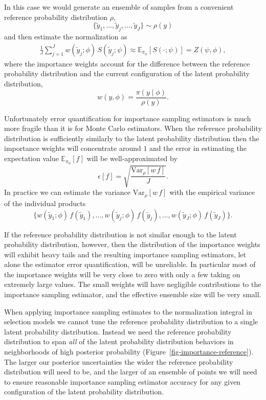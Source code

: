 \documentclass[
  letterpaper,
  DIV=11,
  numbers=noendperiod]{scrartcl}
\begin{document}
In this case we would generate an ensemble of samples from a convenient
reference probability distribution \(\rho\), \[
\{ \tilde{y}_{1}, \ldots, \tilde{y}_{j}, \ldots, \tilde{y}_{J} \}
\sim \rho(y)
\] and then estimate the normalization as \begin{align*}
\frac{1}{J} \sum_{j = 1}^{J}
w(\tilde{y}_{j}; \phi) \, S(\tilde{y}_{j}; \psi)
\approx
\mathbb{E}_{\pi_{\phi}}[ S(\cdot ; \psi) ]
=
Z(\psi, \phi),
\end{align*} where the importance weights account for the difference
between the reference probability distribution and the current
configuration of the latent probability distribution, \[
w \! \left( y, \phi \right)
=
\frac{ \pi(y \mid \phi) }{ \rho(y) }.
\]

Unfortunately error quantification for importance sampling estimators is
much more fragile than it is for Monte Carlo estimators. When the
reference probability distribution is sufficiently similarly to the
latent probability distribution then the importance weights will
concentrate around \(1\) and the error in estimating the expectation
value \(\mathbb{E}_{\pi_{\phi}}[f]\) will be well-approximated by \[
\epsilon[f] =
\sqrt{ \frac{\mathrm{Var}_{\rho}[w \, f] }{J} }.
\] In practice we can estimate the variance
\(\mathrm{Var}_{\rho}[w \, f]\) with the empirical variance of the
individual products \[
\{ w(\tilde{y}_{1}; \phi) \, f(\tilde{y}_{1}), \ldots,
   w(\tilde{y}_{j}; \phi) \, f(\tilde{y}_{j}), \ldots,
   w(\tilde{y}_{J}; \phi) \, f(\tilde{y}_{J}) \}.
\]

If the reference probability distribution is not similar enough to the
latent probability distribution, however, then the distribution of the
importance weights will exhibit heavy tails and the resulting importance
sampling estimators, let alone the estimator error quantification, will
be unreliable. In particular most of the importance weights will be very
close to zero with only a few taking on extremely large values. The
small weights will have negligible contributions to the importance
sampling estimator, and the effective ensemble size will be very small.

When applying importance sampling estimates to the normalization
integral in selection models we cannot tune the reference probability
distribution to a single latent probability distribution. Instead we
need the reference probability distribution to span \emph{all} of the
latent probability distribution behaviors in neighborhoods of high
posterior probability (Figure~\ref{fig-importance-reference}). The
larger our posterior uncertainties the wider the reference probability
distribution will need to be, and the larger of an ensemble of points we
will need to ensure reasonable importance sampling estimator accuracy
for any given configuration of the latent probability distribution.
\end{document}

